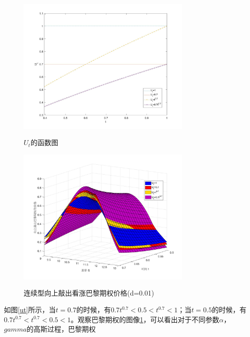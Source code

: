 \documentclass{ctexart} %
\begin{document}
\begin{figure}[H]
\begin{minipage}{0.48\linewidth}
\label{ut}
\includegraphics[width=8.5cm]{code/ut.jpg}
\caption{$U_t$的函数图}
\end{minipage}
\begin{minipage}{0.48\linewidth}
\label{mg1}
\includegraphics[width=8.5cm]{code/mg1.jpg}
\caption{连续型向上敲出看涨巴黎期权价格(d=0.01)}
\end{minipage}
\end{figure}
如图\ref{ut}所示，当$t=0.7$的时候，有$0.7t^0.7<0.5<t^0.7<1$；当$t=0.5$的时候，有$0.7t^0.7<t^0.7<0.5<1$。观察巴黎期权的图像\ref{mg1}，可以看出对于不同参数$\alpha$，$gamma$的高斯过程，巴黎期权
\end{document}
